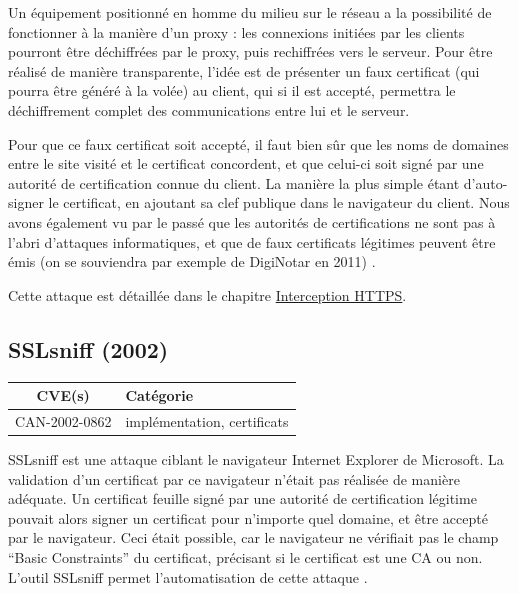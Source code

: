 Un équipement positionné en homme du milieu sur le réseau a la possibilité de fonctionner à la manière d'un proxy : les connexions initiées par les clients pourront être déchiffrées par le proxy, puis rechiffrées vers le serveur. Pour être réalisé de manière transparente, l'idée est de présenter un faux certificat (qui pourra être généré à la volée) au client, qui si il est accepté, permettra le déchiffrement complet des communications entre lui et le serveur.

Pour que ce faux certificat soit accepté, il faut bien sûr que les noms de domaines entre le site visité et le certificat concordent, et que celui-ci soit signé par une autorité de certification connue du client. La manière la plus simple étant d'auto-signer le certificat, en ajoutant sa clef publique dans le navigateur du client. Nous avons également vu par le passé que les autorités de certifications ne sont pas à l'abri d'attaques informatiques, et que de faux certificats légitimes peuvent être émis (on se souviendra par exemple de DigiNotar en 2011) \cite{https-interception}.

Cette attaque est détaillée dans le chapitre \hyperref[sec:https-interception]{Interception HTTPS}.



\subsection{SSLsniff (2002)}

\begin{tabularx}{0.96\textwidth}{|c|X|}
  \hline
  \textbf{CVE(s)} & \textbf{Catégorie} \\
  \hline
  CAN-2002-0862 & implémentation, certificats \\
  \hline
\end{tabularx}

\vspace{1em}

SSLsniff est une attaque ciblant le navigateur Internet Explorer de Microsoft. La validation d'un certificat par ce navigateur n'était pas réalisée de manière adéquate. Un certificat feuille signé par une autorité de certification légitime pouvait alors signer un certificat pour n'importe quel domaine, et être accepté par le navigateur. Ceci était possible, car le navigateur ne vérifiait pas le champ ``Basic Constraints'' du certificat, précisant si le certificat est une CA ou non. L'outil SSLsniff permet l'automatisation de cette attaque \cite{sslsniff-website}.


